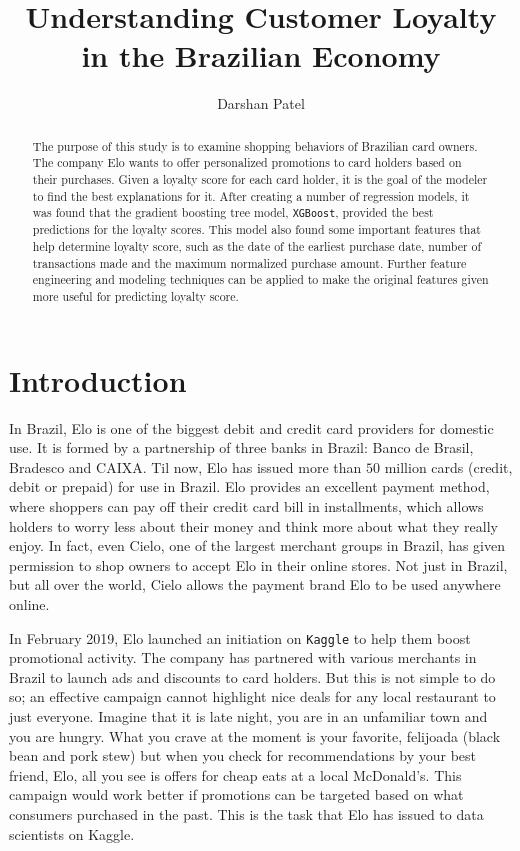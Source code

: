 \documentclass[journal, a4paper]{IEEEtran}
\begin{document}
\title{Understanding Customer Loyalty \\ in the Brazilian Economy}
\author{Darshan Patel}
\maketitle

\begin{abstract}
The purpose of this study is to examine shopping behaviors of Brazilian card owners. The company Elo wants to offer personalized promotions to card holders based on their purchases. Given a loyalty score for each card holder, it is the goal of the modeler to find the best explanations for it. After creating a number of regression models, it was found that the gradient boosting tree model, \texttt{XGBoost}, provided the best predictions for the loyalty scores. This model also found some important features that help determine loyalty score, such as the date of the earliest purchase date, number of transactions made and the maximum normalized purchase amount. Further feature engineering and modeling techniques can be applied to make the original features given more useful for predicting loyalty score. 

\end{abstract}

\section{Introduction}
In Brazil, Elo is one of the biggest debit and credit card providers for domestic use. It is formed by a partnership of three banks in Brazil: Banco de Brasil, Bradesco and CAIXA. Til now, Elo has issued more than $50$ million cards (credit, debit or prepaid) for use in Brazil. Elo provides an excellent payment method, where shoppers can pay off their credit card bill in installments, which allows holders to worry less about their money and think more about what they really enjoy. In fact, even Cielo, one of the largest merchant groups in Brazil, has given permission to shop owners to accept Elo in their online stores. Not just in Brazil, but all over the world, Cielo allows the payment brand Elo to be used anywhere online. 

In February 2019, Elo launched an initiation on \texttt{Kaggle} to help them boost promotional activity. The company has partnered with various merchants in Brazil to launch ads and discounts to card holders. But this is not simple to do so; an effective campaign cannot highlight nice deals for any local restaurant to just everyone. Imagine that it is late night, you are in an unfamiliar town and you are hungry. What you crave at the moment is your favorite, felijoada (black bean and pork stew) but when you check for recommendations by your best friend, Elo, all you see is offers for cheap eats at a local McDonald's. This campaign would work better if promotions can be targeted based on what consumers purchased in the past. This is the task that Elo has issued to data scientists on Kaggle. 
\end{document}
